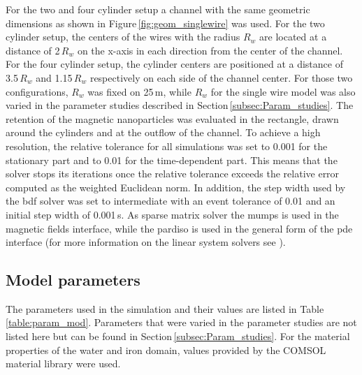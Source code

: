 For the two and four cylinder setup a channel with the same geometric dimensions as shown in Figure\,\ref{fig:geom_singlewire} was used. For the two cylinder setup, the centers of the wires with the radius $R_{w}$ are located at a distance of 2\,$R_{w}$ on the x-axis in each direction from the center of the channel. For the four cylinder setup, the cylinder centers are positioned at a distance of 3.5\,$R_{w}$ and 1.15\,$R_{w}$ respectively on each side of the channel center. For those two configurations, $R_{w}$ was fixed on 25\,\textmu m, while $R_{w}$ for the single wire model was also varied in the parameter studies described in Section\,\ref{subsec:Param_studies}. The retention of the magnetic nanoparticles was evaluated in the rectangle, drawn around the cylinders and at the outflow of the channel. To achieve a high resolution, the relative tolerance for all simulations was set to 0.001 for the stationary part and to 0.01 for the time-dependent part. This means that the solver stops its iterations once the relative tolerance exceeds the relative error computed as the weighted Euclidean norm. In addition, the step width used by the \gls{bdf} solver was set to intermediate with an event tolerance of 0.01 and an initial step width of 0.001\,s. As sparse matrix solver the \gls{mumps} is used in the magnetic fields interface, while the \gls{pardiso} is used in the general form of the \gls{pde} interface (for more information on the linear system solvers see \cite{ComsolRefManual}).   

\newpage
\subsection{Model parameters}
\label{subsec:Cond_param}

The parameters used in the simulation and their values are listed in Table\,\ref{table:param_mod}. Parameters that were varied in the parameter studies are not listed here but can be found in Section\,\ref{subsec:Param_studies}. For the material properties of the water and iron domain, values provided by the COMSOL material library were used.   

